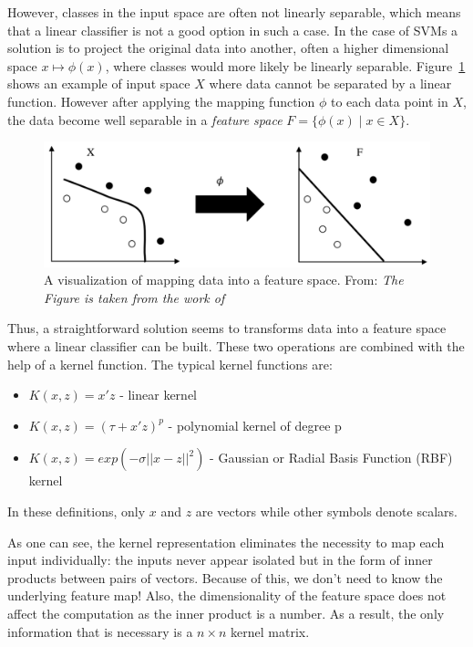 However, classes in the input space are often not linearly separable, which means that a linear classifier is not a good option in such a case. In the case of SVMs a solution is to project the original data into another, often a higher dimensional space \(x \mapsto \phi(x) \), where classes would more likely be linearly separable. Figure~\ref{fig:hyperplane2} shows an example of input space \(X\) where data cannot be separated by a linear function. However after applying the mapping function \(\phi\) to each data point in \(X\), the data become well separable in a \textit{feature space} \(F = \{ \phi(x)\; | \; x \in X\}\).
\begin{figure}[h!]
    \centering
    \includegraphics[scale=0.6]{Graphics/svp-separation.png}
    \caption{A visualization of mapping data into a feature space. \newline
         From: \textit{The Figure is taken from the work of}~\protect\cite{Okun;Valentini:2009}
    }
    \label{fig:hyperplane2}
\end{figure}

Thus, a straightforward solution seems to transforms data into a feature space where a linear classifier can be built. These two operations are combined with the help of a kernel function. The typical kernel functions are:
\begin{itemize}
            \item \(K(x,z) = x'z \) - linear kernel
            \item \(K(x,z) = (\tau + x'z)^p\) - polynomial kernel of degree p
            \item \(K(x,z) = exp(-\sigma||x-z||^2)\) - Gaussian or Radial Basis Function (RBF) kernel
\end{itemize}

In these definitions, only $x$ and $z$ are vectors while other symbols denote scalars.

As one can see, the kernel representation eliminates the necessity to map each input individually: the inputs never appear isolated but in the form of inner products between pairs of vectors. Because of this, we don't need to know the underlying feature map! Also, the dimensionality of the feature space does not affect the computation as the inner product is a number. As a result, the only information that is necessary is a \(n\times n\) kernel matrix.

